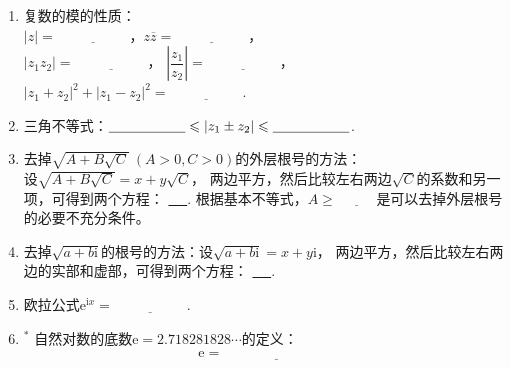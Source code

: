 \documentclass{article}
\newif\ifte
\newcommand{\e}{\mathrm{e}}
\renewcommand{\i}{\mathrm{i}}
\renewcommand\leq\leqslant
\renewcommand\geq\geqslant
\begin{document}
\begin{multicols}{2}
\begin{enumerate}[leftmargin=20pt]
\item 复数的模的性质：\\ $ |z|=\underline{\ \ifte |\overline{z}|
    \else \hspace{2cm} \fi\ } $，$ z\overline{z}=\underline{\ 
\ifte |z|^2=|\overline{z}|^2\else \hspace{2cm} \fi\ }$，\\
$ |z_1z_2|=\underline{\ \ifte |z_1||z_2|\else \hspace{2cm} \fi\ } $，
$ \left|\dfrac{z_1}{z_2}\right|=\underline{\ \ifte 
 \dfrac{|z_1|}{|z_2|}\else \hspace{2cm} \fi\ } $，\\
$ |z_1+z_2|^2+|z_1-z_2|^2=\underline{\ \ifte 
2\left( |z_1|^2+|z_2|^2 \right) \else \hspace{2cm} \fi\ }$. 

\item 三角不等式：$ \underline{\ \ifte ||z_1|-|z_2||
  \else \hspace{1.7cm} \fi\ }\leq |z_1\pm z_2| \leq 
\underline{\ \ifte |z_1|+|z_2|\else \hspace{1.7cm} \fi\ }$. 

\item 去掉$ \sqrt{A+B\sqrt{C}}\ (A>0,C>0) $的外层根号的方法：\\ 
设$ \sqrt{A+B\sqrt{C}}=x+y\sqrt{C} $，
两边平方，然后比较左右两边$ \sqrt{C} $的系数和另一项，可得到两个方程：
\underline{\ \ifte $ A=x^2+y^2C,\ B=2xy $\else \hspace{4cm} \fi\ }.
根据基本不等式，$ A\geq \underline{\ \ifte |B|\sqrt{C}
\else \hspace{1cm} \fi\ } $是可以去掉外层根号的必要不充分条件。

\item 去掉$ \sqrt{a+b\i} $的根号的方法：设$ \sqrt{a+b\i}=x+y\i $，
两边平方，然后比较左右两边的实部和虚部，可得到两个方程：
\underline{\ \ifte $ a=x^2-y^2,\ b=2xy $\else \hspace{4cm} \fi\ }.

\item 欧拉公式$ \e^{\i x}=\underline{\ \ifte 
    \cos x+\i\sin x\else \hspace{2cm} \fi\ } $.

\item $^*$ 自然对数的底数$ \e=2.718281828 \cdots $的定义：
\begin{align*}
    \e=\underline{\ \ifte \lim_{n\to \infty}\left( 1+
       \dfrac{1}{n}\right)^n\else \hspace{3cm} \fi\ }
\end{align*}


\end{enumerate}
\end{multicols}
\end{document}
